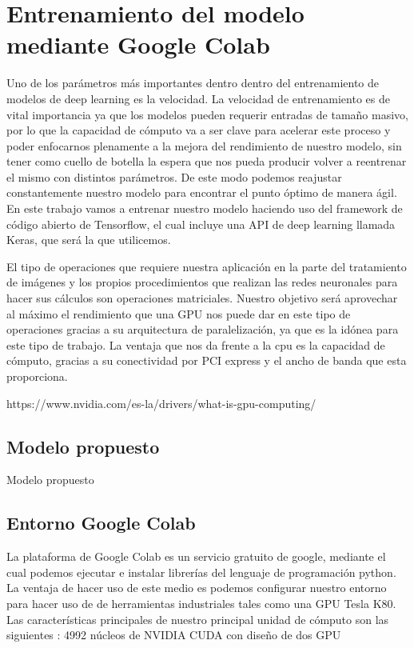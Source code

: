 \mbox{}


\chapter{Entrenamiento del modelo mediante Google Colab}
\label{ch:chapter2}
Uno de los parámetros más importantes dentro dentro del entrenamiento de modelos de deep learning es la velocidad.
La velocidad de entrenamiento es de vital importancia ya que los modelos pueden requerir entradas de tamaño masivo, por lo que la capacidad de cómputo
va a ser clave para acelerar este proceso y poder enfocarnos plenamente a la mejora del rendimiento de nuestro modelo, sin tener como cuello de botella la espera
que nos pueda producir volver a reentrenar el mismo con distintos parámetros.
De este modo podemos reajustar constantemente nuestro modelo para encontrar el punto óptimo de manera ágil.
En este trabajo vamos a entrenar nuestro modelo haciendo uso del framework de código abierto de Tensorflow, el cual incluye una API de deep learning llamada Keras, que será la que utilicemos.

El tipo de operaciones que requiere nuestra aplicación en la parte del tratamiento de imágenes y los propios procedimientos que realizan las redes neuronales
para hacer sus cálculos son operaciones matriciales.
Nuestro objetivo será aprovechar al máximo el rendimiento que una GPU nos puede dar en este tipo de operaciones gracias
a su arquitectura de paralelización, ya que es la idónea para este tipo de trabajo.
La ventaja que nos da frente a la cpu es la capacidad de cómputo, gracias a su conectividad por PCI express y el ancho de banda que esta proporciona.

https://www.nvidia.com/es-la/drivers/what-is-gpu-computing/

\section{Modelo propuesto}\label{sec:modelo-propuesto}
Modelo propuesto
\section{Entorno Google Colab}\label{sec:entorno-google-colab}
La plataforma de Google Colab es un servicio gratuito de google, mediante el cual podemos ejecutar e instalar librerías del lenguaje de programación python.
La ventaja de hacer uso de este medio es podemos configurar nuestro entorno para hacer uso de de herramientas industriales tales como una GPU Tesla K80.
Las características principales de nuestro principal unidad de cómputo son las siguientes :
4992 núcleos de NVIDIA CUDA con diseño de dos GPU